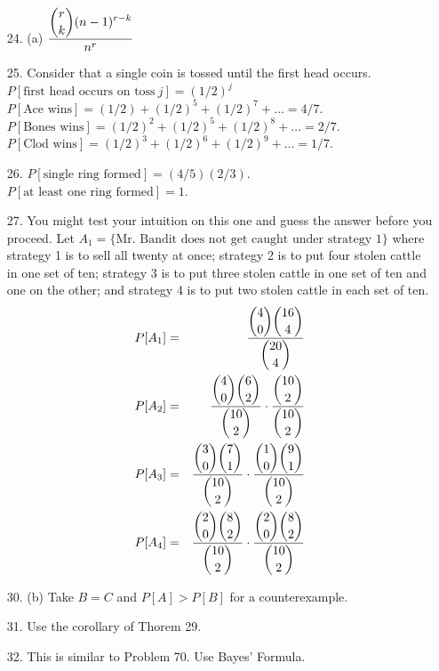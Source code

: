 \begin{enumerate}
	\item[24.] (a) $\dfrac{\displaystyle {r\choose k}(n-1)^{r-k}}{n^r}$

	\item[25.] Consider that a single coin is tossed until the first head occurs. \\
				$P[\text{first head occurs on toss}\ j] = (1/2)^j$ \\
				$P[\text{Ace wins}] = (1/2) + (1/2)^5 + (1/2)^7 + \ldots = 4/7$. \\
				$P[\text{Bones wins}] = (1/2)^2 + (1/2)^5 + (1/2)^8 + \ldots = 2/7$. \\
				$P[\text{Clod wins}] = (1/2)^3 + (1/2)^6 + (1/2)^9 + \ldots = 1/7$. 
	
	\item[26.] $P[\text{single ring formed}] = (4/5)(2/3)$. \\
				$P[\text{at least one ring formed}] = 1$. 
		
	\item[27.] You might test your intuition on this one and guess the answer before you proceed.  Let $A_1 = \{\text{Mr. Bandit does not get caught under strategy 1}\}$ where strategy 1 is to sell all twenty at once; strategy 2 is to put four stolen cattle in one set of ten; strategy 3 is to put three stolen cattle in one set of ten and one on the other; and strategy 4 is to put two stolen cattle in each set of ten.
	\begin{eqnarray*}
		P[A_1] &=& \dfrac{\displaystyle {4\choose 0}{16\choose 4}}{\displaystyle {20\choose 4}} \\
		P[A_2] &=& \dfrac{\displaystyle {4\choose 0}{6\choose 2}}{\displaystyle {10\choose 2}} \cdot \dfrac{\displaystyle {10\choose 2}}{\displaystyle {10\choose 2}} \\
		P[A_3] &=& \dfrac{\displaystyle {3\choose 0}{7\choose 1}}{\displaystyle {10\choose 2}} \cdot \dfrac{\displaystyle {1\choose 0}{9\choose 1}}{\displaystyle {10\choose 2}} \\
		P[A_4] &=& \dfrac{\displaystyle {2\choose 0}{8\choose 2}}{\displaystyle {10\choose 2}} \cdot \dfrac{\displaystyle {2\choose 0}{8\choose 2}}{\displaystyle {10\choose 2}}				
	\end{eqnarray*}

	\newpage
	\item[30.] (b) Take $B=C$ and $P[A]>P[B]$ for a counterexample.
	
	\item[31.] Use the corollary of Thorem 29.
	
	\item[32.] This is similar to Problem 70.  Use Bayes' Formula.
	

\end{enumerate}
